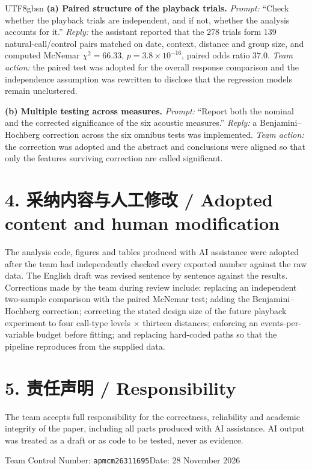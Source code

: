 \documentclass[11pt,a4paper]{article}
\begin{document}
\begin{CJK*}{UTF8}{gbsn}
\noindent\textbf{(a) Paired structure of the playback trials.}
\emph{Prompt:} ``Check whether the playback trials are independent, and if not, whether the
analysis accounts for it.'' \emph{Reply:} the assistant reported that the 278 trials form
139 natural-call/control pairs matched on date, context, distance and group size, and
computed McNemar $\chi^2=66.33$, $p=3.8\times10^{-16}$, paired odds ratio $37.0$.
\emph{Team action:} the paired test was adopted for the overall response comparison and the
independence assumption was rewritten to disclose that the regression models remain
unclustered.

\medskip
\noindent\textbf{(b) Multiple testing across measures.}
\emph{Prompt:} ``Report both the nominal and the corrected significance of the six acoustic
measures.'' \emph{Reply:} a Benjamini--Hochberg correction across the six omnibus tests was
implemented. \emph{Team action:} the correction was adopted and the abstract and conclusions
were aligned so that only the features surviving correction are called significant.

\section*{4. 采纳内容与人工修改 / Adopted content and human modification}

The analysis code, figures and tables produced with AI assistance were adopted after the
team had independently checked every exported number against the raw data. The English draft
was revised sentence by sentence against the results. Corrections made by the team during
review include: replacing an independent two-sample comparison with the paired McNemar test;
adding the Benjamini--Hochberg correction; correcting the stated design size of the future
playback experiment to four call-type levels $\times$ thirteen distances; enforcing an
events-per-variable budget before fitting; and replacing hard-coded paths so that the
pipeline reproduces from the supplied data.

\section*{5. 责任声明 / Responsibility}

The team accepts full responsibility for the correctness, reliability and academic integrity
of the paper, including all parts produced with AI assistance. AI output was treated as a
draft or as code to be tested, never as evidence.

\vspace{4mm}
\noindent Team Control Number: \texttt{apmcm26311695}\hfill Date: 28 November 2026

\end{CJK*}
\end{document}
